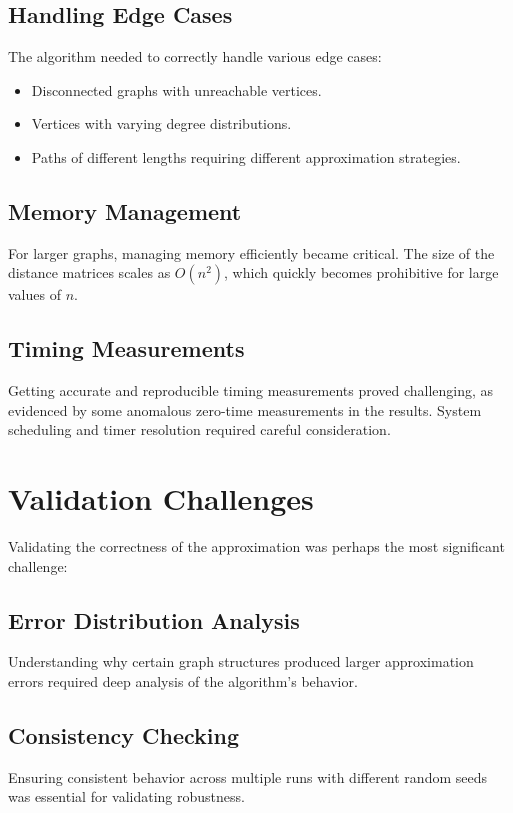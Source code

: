 \documentclass[a4paper,11pt,oneside]{book}
\begin{document}
\subsection{Handling Edge Cases}
The algorithm needed to correctly handle various edge cases:
\begin{itemize}
    \item Disconnected graphs with unreachable vertices.
    \item Vertices with varying degree distributions.
    \item Paths of different lengths requiring different approximation strategies.
\end{itemize}

\subsection{Memory Management}
For larger graphs, managing memory efficiently became critical. The size of the distance matrices scales as $O(n^2)$, which quickly becomes prohibitive for large values of $n$.

\subsection{Timing Measurements}
Getting accurate and reproducible timing measurements proved challenging, as evidenced by some anomalous zero-time measurements in the results. System scheduling and timer resolution required careful consideration.

\section{Validation Challenges}
Validating the correctness of the approximation was perhaps the most significant challenge:

\subsection{Error Distribution Analysis}
Understanding why certain graph structures produced larger approximation errors required deep analysis of the algorithm's behavior.

\subsection{Consistency Checking}
Ensuring consistent behavior across multiple runs with different random seeds was essential for validating robustness.
\end{document}
